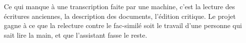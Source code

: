 \begin{noteblock}
Ce qui manque à une transcription faite par une machine, c'est la lecture des écritures
anciennes, la description des documents, l'édition critique. Le projet gagne à ce que la
relecture contre le fac-similé soit le travail d'une personne qui sait lire la main, et que
l'assistant fasse le reste.
\end{noteblock}
